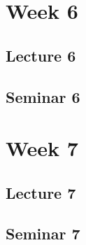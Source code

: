 \documentclass[
]{article}
\begin{document}
\hypertarget{Chapter-7}{%
\section{Week 6}\label{Chapter-7}}

\hypertarget{lecture-6}{%
\subsection{Lecture 6}\label{lecture-6}}

\hypertarget{seminar-6}{%
\subsection{Seminar 6}\label{seminar-6}}

\hypertarget{week-7}{%
\section{Week 7}\label{week-7}}

\hypertarget{lecture-7}{%
\subsection{Lecture 7}\label{lecture-7}}

\hypertarget{seminar-7}{%
\subsection{Seminar 7}\label{seminar-7}}
\end{document}
